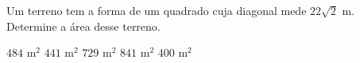 \noindent\parbox{\linewidth}{

Um terreno tem a forma de um quadrado cuja diagonal mede $22\sqrt{2}$ m. Determine a área desse terreno.

$484$ m$^2$
$441$ m$^2$
$729$ m$^2$
$841$ m$^2$
$400$ m$^2$



}


